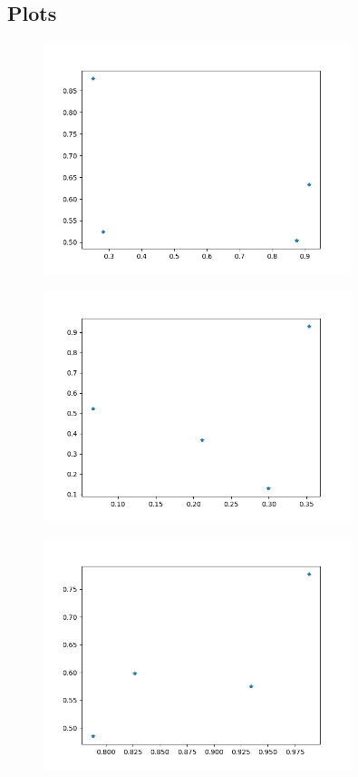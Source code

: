 \documentclass[a4paper]{article}%
\begin{document}
%
\subsection{Plots}%
\label{subsec:Plots}%
\begin{figure}[H]%
\centering%
\includegraphics[width=0.8\textwidth]{files/plot_0.png}%
\end{figure}%
\begin{figure}[H]%
\centering%
\includegraphics[width=0.8\textwidth]{files/plot_1.png}%
\end{figure}%
\begin{figure}[H]%
\centering%
\includegraphics[width=0.8\textwidth]{files/plot_2.png}%
\end{figure}%
\end{document}
